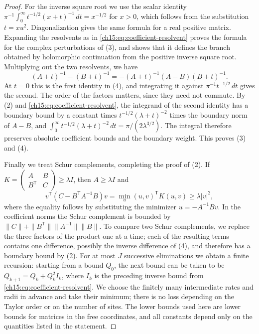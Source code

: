 \begin{proof}
For the inverse square root we use the scalar identity $\pi^{-1}\int_0^\infty t^{-1/2}(x+t)^{-1}\,dt=x^{-1/2}$ for $x>0$, which follows from the substitution $t=xu^2$. Diagonalization gives the same formula for a real positive matrix. Expanding the resolvents as in \eqref{ch15:eq:coefficient-resolvent} proves the formula for the complex perturbations of (3), and shows that it defines the branch obtained by holomorphic continuation from the positive inverse square root. Multiplying out the two resolvents, we have
\[
 (A+t)^{-1}-(B+t)^{-1}
   =-(A+t)^{-1}(A-B)(B+t)^{-1}.
\]
At $t=0$ this is the first identity in (4), and integrating it against $\pi^{-1}t^{-1/2}\,dt$ gives the second. The order of the factors matters, since they need not commute. By (2) and \eqref{ch15:eq:coefficient-resolvent}, the integrand of the second identity has a boundary bound by a constant times $t^{-1/2}(\lambda+t)^{-2}$ times the boundary norm of $A-B$, and $\int_0^\infty t^{-1/2}(\lambda+t)^{-2}\,dt=\pi/(2\lambda^{3/2})$. The integral therefore preserves absolute coefficient bounds and the boundary weight. This proves (3) and (4).

Finally we treat Schur complements, completing the proof of (2). If
$K=\left(\begin{smallmatrix}A&B\\B^{\mathsf T}&C\end{smallmatrix}\right)\ge\lambda I$, then $A\ge\lambda I$ and
\begin{equation}\label{ch15:eq:schur-lower}
 v^{\mathsf T}(C-B^{\mathsf T}A^{-1}B)v
 =\min_u (u,v)^{\mathsf T}K(u,v)\ge\lambda|v|^2,
\end{equation}
where the equality follows by substituting the minimizer $u=-A^{-1}Bv$. In the coefficient norms the Schur complement is bounded by $\|C\|+\|B^{\mathsf T}\|\|A^{-1}\|\|B\|$. To compare two Schur complements, we replace the three factors of the product one at a time; each of the resulting terms contains one difference, possibly the inverse difference of (4), and therefore has a boundary bound by (2). For at most $J$ successive eliminations we obtain a finite recursion: starting from a bound $Q_0$, the next bound can be taken to be $Q_{k+1}=Q_k+Q_k^2I_k$, where $I_k$ is the preceding inverse bound from \eqref{ch15:eq:coefficient-resolvent}. We choose the finitely many intermediate rates and radii in advance and take their minimum; there is no loss depending on the Taylor order or on the number of sites. The lower bounds used here are lower bounds for matrices in the free coordinates, and all constants depend only on the quantities listed in the statement.
\end{proof}

